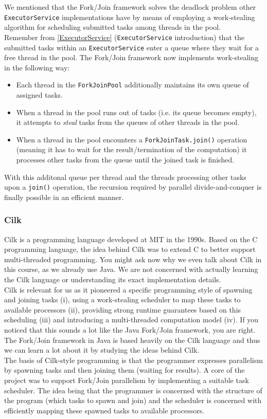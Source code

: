 \documentclass[main.tex]{subfiles}
\begin{document}
We mentioned that the Fork/Join framework solves the deadlock problem other \texttt{ExecutorService} implementations have by means of employing a work-stealing algorithm for scheduling submitted tasks among threads in the pool.\\[3mm]
Remember from \ref{ExecutorService} (\texttt{ExecutorService} introduction) that the submitted tasks within an \texttt{ExecutorService} enter a queue where they wait for a free thread in the pool. The Fork/Join framework now implements work-stealing in the following way:

\begin{itemize}
  \item Each thread in the \texttt{ForkJoinPool} additionally maintains its own queue of assigned tasks.
  \item When a thread in the pool runs out of tasks (i.e. its queue becomes empty), it attempts to \textit{steal} tasks from the queues of other threads in the pool.
  \item When a thread in the pool encounters a \texttt{ForkJoinTask.join()} operation (meaning it has to wait for the result/termination of the computation) it processes other tasks from the queue until the joined task is finished.
\end{itemize}

\noindent With this additonal queue per thread and the threads processing other tasks upon a \texttt{join()} operation, the recursion required by parallel divide-and-conquer is finally possible in an efficient manner.

\subsubsection{Cilk}
Cilk is a programming language developed at MIT in the 1990s. Based on the C programming language, the idea behind Cilk was to extend C to better support multi-threaded programming. You might ask now why we even talk about Cilk in this course, as we already use Java. We are not concerned with actually learning the Cilk language or understanding its exact implementation details.\\
Cilk is relevant for us as it pioneered a specific programming style of spawning and joining tasks (i), using a work-stealing scheduler to map these tasks to available processors (ii), providing strong runtime guarantees based on this scheduling (iii) and introducing a multi-threaded computation model (iv). If you noticed that this sounds a lot like the Java Fork/Join framework, you are right. The Fork/Join framework in Java is based heavily on the Cilk language and thus we can learn a lot about it by studying the ideas behind Cilk.\\
The basis of Cilk-style programming is that the programmer expresses parallelism by spawning tasks and then joining them (waiting for results). A core of the project was to support Fork/Join parallelism by implementing a suitable task scheduler. The idea being that the programmer is concerned with the structure of the program (which tasks to spawn and join) and the scheduler is concerned with efficiently mapping these spawned tasks to available processors.
\end{document}
